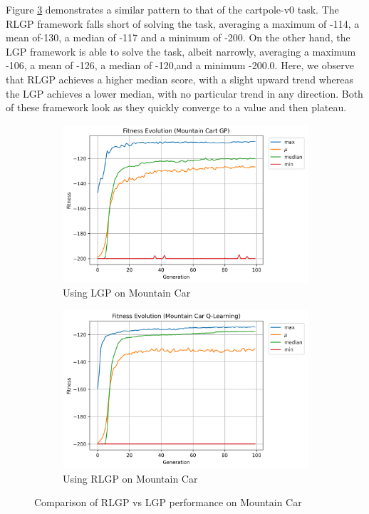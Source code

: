 \documentclass[12pt, final]{dalcsthesis}
\begin{document}
Figure \ref{fig:mountain-car-comparison} demonstrates a similar pattern to that of the cartpole-v0 task. The RLGP framework falls short of solving the task, averaging a maximum of -114, a mean of-130, a median of -117 and a minimum of -200. On the other hand, the LGP framework is able to solve the task, albeit narrowly, averaging a maximum -106, a mean of -126, a median of -120,and a minimum -200.0. Here, we observe that RLGP achieves a higher median score, with a slight upward trend whereas the LGP achieves a lower median, with no particular trend in any direction. Both of these framework look as they quickly converge to a value and then plateau.

\begin{figure}[ht]
	\centering
	\begin{subfigure}{1.0\textwidth}
		\includegraphics[width=\linewidth]{mountain_car_lgp.png}
		\caption{Using LGP on Mountain Car}
		\label{fig:mountain-car-lgp}
	\end{subfigure}
	\hfill
	\begin{subfigure}{1.0\textwidth}
		\includegraphics[width=\linewidth]{mountain_car_q.png}
		\caption{Using RLGP on Mountain Car}
		\label{fig:mountain-car-q}
	\end{subfigure}
	\caption{Comparison of RLGP vs LGP performance on Mountain Car}
	\label{fig:mountain-car-comparison}
\end{figure}
\end{document}
